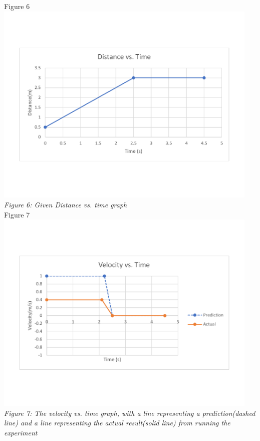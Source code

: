 \documentclass[aps,letterpaper,11pt]{revtex4}
\begin{document}
\begin{center}
Figure 6\\
\vspace{-10mm}
\includegraphics[width=5in]{PositionVsTimeForPartC.pdf}\\
\vspace{-10mm}
\textit{Figure 6: Given Distance vs. time graph}\\
\newpage
Figure 7\\
\vspace{-10mm}
\includegraphics[width=5in]{VelocityVsTimeGraphForPartC.pdf}\\
\vspace{-10mm}
\textit{Figure 7: The velocity vs. time graph, with a line representing a prediction(dashed line) and a line representing the actual result(solid line) from running the experiment}
\end{center} 
\end{document}
